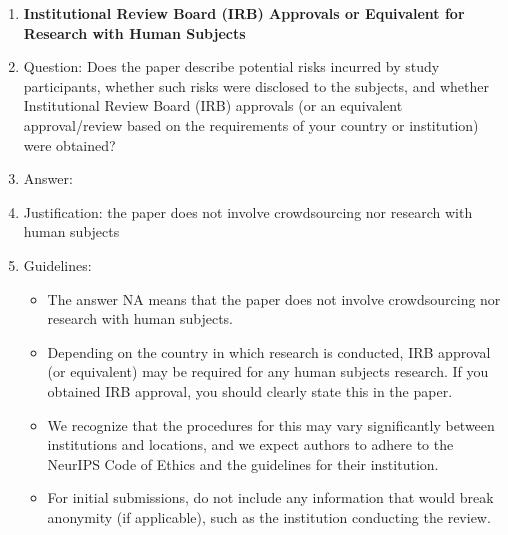 \documentclass{article}
\begin{document}
\begin{enumerate}
\begin{itemize}
        \item According to the NeurIPS Code of Ethics, workers involved in data collection, curation, or other labor should be paid at least the minimum wage in the country of the data collector.
    \end{itemize}
\item {\bf Institutional Review Board (IRB) Approvals or Equivalent for Research with Human Subjects}
    \item[] Question: Does the paper describe potential risks incurred by study participants, whether such risks were disclosed to the subjects, and whether Institutional Review Board (IRB) approvals (or an equivalent approval/review based on the requirements of your country or institution) were obtained?
    \item[] Answer: \answerNA{}
    \item[] Justification: the paper does not involve crowdsourcing nor research with human subjects
    \item[] Guidelines:
    \begin{itemize}
        \item The answer NA means that the paper does not involve crowdsourcing nor research with human subjects.
        \item Depending on the country in which research is conducted, IRB approval (or equivalent) may be required for any human subjects research. If you obtained IRB approval, you should clearly state this in the paper.
        \item We recognize that the procedures for this may vary significantly between institutions and locations, and we expect authors to adhere to the NeurIPS Code of Ethics and the guidelines for their institution.
        \item For initial submissions, do not include any information that would break anonymity (if applicable), such as the institution conducting the review.
    \end{itemize}
\end{enumerate}
\end{document}
